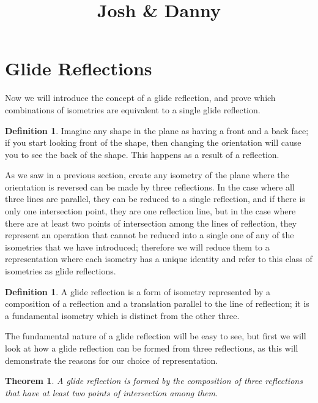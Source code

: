 \documentclass[11pt]{article}
\newtheorem{theorem}{Theorem}[section]
\theoremstyle{definition}
\newtheorem{definition}[]{Definition}
\begin{document}


\title{Josh \& Danny}

\maketitle

\section{Glide Reflections}
Now we will introduce the concept of a glide reflection, and prove which
combinations of isometries are equivalent to a single glide reflection.

\begin{definition}\label{orientation}
  Imagine any shape in the plane as having a front and a back face; if you
  start looking front of the shape, then changing the orientation will cause
  you to see the back of the shape. This happens as a result of a reflection.
\end{definition}

As we saw in a previous section, create any isometry of the plane where the
orientation is reversed can be made by three reflections. In the case where all
three lines are parallel, they can be reduced to a single reflection, and if
there is only one intersection point, they are one reflection line, but in the
case where there are at least two points of intersection among the lines of
reflection, they represent an operation that cannot be reduced into a single
one of any of the isometries that we have introduced; therefore we will reduce
them to a representation where each isometry has a unique identity and refer to
this class of isometries as glide reflections.

\begin{definition}\label{glide reflection}
  A glide reflection is a form of isometry represented by a composition of a
reflection and a translation parallel to the line of reflection; it is a
fundamental isometry which is distinct from the other three.
\end{definition}

The fundamental nature of a glide reflection will be easy to see, but first we
will look at how a glide reflection can be formed from three reflections, as
this will demonstrate the reasons for our choice of representation.

\begin{theorem}\label{3 reflections form a glide reflection}
  A glide reflection is formed by the composition of three reflections that
  have at least two points of intersection among them.
\end{theorem}
\end{document}

